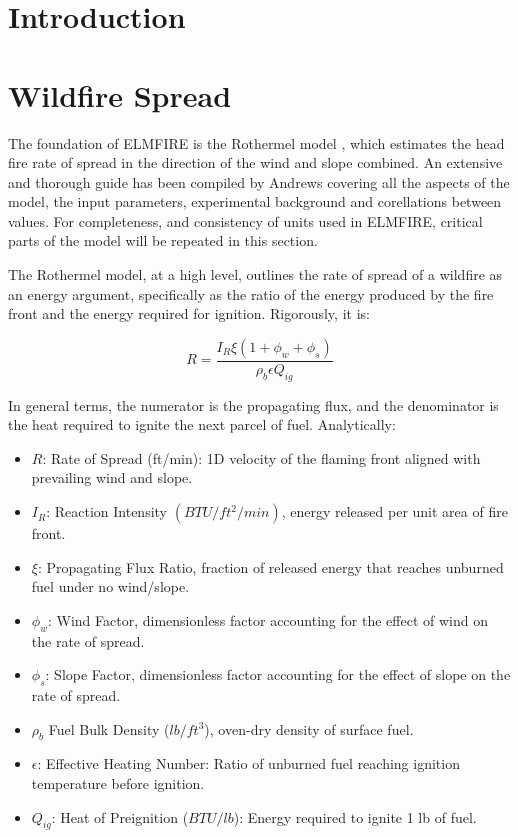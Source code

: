\section{Introduction}


\section{Wildfire Spread}

The foundation of ELMFIRE is the Rothermel model \cite{rothermelMathematicalModelPredicting1972, albiniEstimatingWildfireBehavior1976}, which estimates the head fire rate of spread in the direction of the wind and slope combined. An extensive and thorough guide has been compiled by Andrews \cite{andrewsRothermelSurfaceFire2018} covering all the aspects of the model, the input parameters, experimental background and corellations between values. For completeness, and consistency of units used in ELMFIRE, critical parts of the model will be repeated in this section. 

The Rothermel model, at a high level, outlines the rate of spread of a wildfire as an energy argument, specifically as the ratio of the energy produced by the fire front and the energy required for ignition. Rigorously, it is:

\begin{equation}
    R=\frac{I_R\xi(1+\phi_w+\phi_s)}{\rho_b\epsilon Q_{ig}}
\end{equation}

In general terms, the numerator is the propagating flux, and the denominator is the heat required to ignite the next parcel of fuel. Analytically:

\begin{itemize}
    \item $R$: Rate of Spread (ft/min): 1D velocity of the flaming front aligned with prevailing wind and slope.
    \item $I_R$: Reaction Intensity $(BTU/ft^2/min)$, energy released per unit area of fire front.
    \item $\xi$: Propagating Flux Ratio, fraction of released energy that reaches unburned fuel under no wind/slope.
    \item $\phi_w$: Wind Factor, dimensionless factor accounting for the effect of wind on the rate of spread. 
    \item $\phi_s$: Slope Factor, dimensionless factor accounting for the effect of slope on the rate of spread. 
    \item $\rho_b$ Fuel Bulk Density ($lb/ft^3$), oven-dry density of surface fuel.
    \item $\epsilon$: Effective Heating Number: Ratio of unburned fuel reaching ignition temperature before ignition.
    \item $Q_{ig}$: Heat of Preignition ($BTU/lb$): Energy required to ignite 1 lb of fuel. 
\end{itemize}

